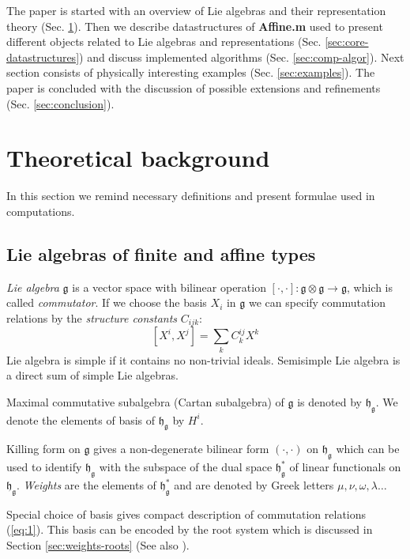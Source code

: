 \documentclass[preprint,12pt]{elsarticle}
\newcommand{\gf}{\mathfrak{g}}
\newcommand{\hf}{\mathfrak{h}}
\newcommand{\hfg}{\hf_{\gf}}
\begin{document}
The paper is started with an overview of Lie algebras and their representation theory (Sec. \ref{sec:theor-backgr}). Then we describe datastructures of {\bf Affine.m} used to present different objects related to Lie algebras and representations (Sec. \ref{sec:core-datastructures}) and discuss implemented algorithms (Sec. \ref{sec:comp-algor}). Next section consists of physically interesting examples (Sec. \ref{sec:examples}). The paper is concluded with the discussion of possible extensions and refinements (Sec. \ref{sec:conclusion}).

\section{Theoretical background}
\label{sec:theor-backgr}

In this section we remind necessary definitions and present formulae used in computations. 

\subsection{Lie algebras of finite and affine types}
\label{sec:lie-algebras-finite}

{\it Lie algebra} $\gf$ is a vector space with bilinear operation $[\cdot,\cdot]:\gf\otimes\gf\to \gf$, which is called {\it commutator}. If we choose the basis $X_{i}$ in $\gf$ we can specify commutation relations by the {\it structure constants} $C_{ijk}$:
\begin{equation}
  \label{eq:1}
  [X^{i},X^{j}]=\sum_{k} C^{ij}_{k} X^{k}
\end{equation}
Lie algebra is simple if it contains no non-trivial ideals. Semisimple Lie algebra is a direct sum of simple Lie algebras.

Maximal commutative subalgebra (Cartan subalgebra) of $\gf$ is denoted by $\hfg$.
We denote the elements of basis of $\hfg$ by $H^{i}$.

Killing form on $\gf$ gives a non-degenerate bilinear form $(\cdot,\cdot)$ on $\hfg$ which can be used to identify $\hfg$ with the subspace of the dual space $\hfg^{*}$ of linear functionals on $\hfg$. {\it Weights} are the elements of $\hfg^{*}$ and are denoted by Greek letters $\mu,\nu, \omega, \lambda\dots$

Special choice of basis gives compact description of commutation relations (\ref{eq:1}). This basis can be encoded by the root system which is discussed in Section \ref{sec:weights-roots} (See also \cite{humphreys1997introduction,humphreys1992reflection}).
\end{document}
